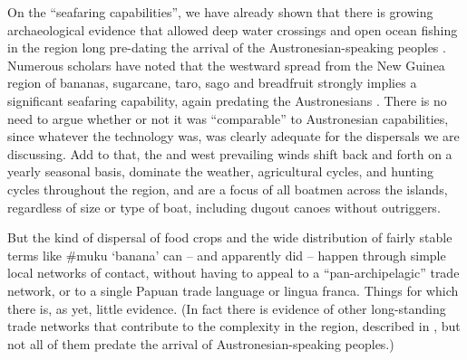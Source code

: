 On the “seafaring capabilities”,
we have already shown that there is growing archaeological evidence
that allowed deep water crossings
and open ocean fishing in the region long pre-dating the arrival
of the Austronesian-speaking peoples
\citep{Spriggs2011,OConnor2015,Bellwood2019ed}.
Numerous scholars have noted that the westward spread from the
New Guinea region of bananas,
sugarcane, taro, sago and breadfruit strongly implies a significant
seafaring capability, again predating the Austronesians
\citep{DenhamDonohue2009,DonohueDenham2009,DonohueDenham2010,Schapper2015,
Klamer2019,GrimesCIP}. There is no need to argue whether or not
it was “comparable” to Austronesian capabilities,
since whatever the technology was,
was clearly adequate for the dispersals we are discussing.
Add to that, the 
and west prevailing winds shift back
and forth on a yearly seasonal basis,
dominate the weather, agricultural cycles,
and hunting cycles throughout the region,
and are a focus of all boatmen across the islands,
regardless of size or type of boat,
including dugout canoes without outriggers.

But the kind of dispersal of food crops
and the wide distribution of fairly stable terms like {\#}muku
‘banana’ can -- and apparently did -- happen through simple local
networks of contact, without having to appeal to a “pan-archipelagic” trade network,
or to a single Papuan trade language or lingua franca.
Things for which there is,
as yet, little evidence.
(In fact there is evidence of other long-standing trade networks
that contribute to the complexity in the region,
described in , but not all of them predate the
arrival of Austronesian-speaking peoples.)

